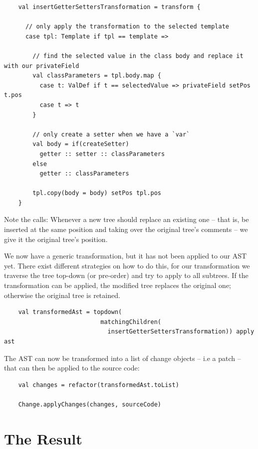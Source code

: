 \documentclass[10pt,a4paper,oneside]{scrreprt}
\begin{document}
\begin{lstlisting}
    val insertGetterSettersTransformation = transform {
        
      // only apply the transformation to the selected template
      case tpl: Template if tpl == template => 
      
        // find the selected value in the class body and replace it with our privateField
        val classParameters = tpl.body.map { 
          case t: ValDef if t == selectedValue => privateField setPos t.pos
          case t => t 
        }
      
        // only create a setter when we have a `var`
        val body = if(createSetter)  
          getter :: setter :: classParameters
        else
          getter :: classParameters
        
        tpl.copy(body = body) setPos tpl.pos
    }
\end{lstlisting}

Note the  calls: Whenever a new tree should replace an existing one -- that is, be inserted at the same position and taking over the original tree's comments -- we give it the original tree's position.

We now have a generic transformation, but it has not been applied to our AST yet. There exist different strategies on how to do this, for our transformation we traverse the tree top-down (or pre-order) and try to apply  to all subtrees. If the transformation can be applied, the modified tree replaces the original one; otherwise the original tree is retained.

\begin{lstlisting}
    val transformedAst = topdown(
                           matchingChildren(
                             insertGetterSettersTransformation)) apply ast
\end{lstlisting}
    
The AST can now be transformed into a list of change objects -- i.e a patch -- that can then be applied to the source code:

\begin{lstlisting}
    val changes = refactor(transformedAst.toList)
    
    Change.applyChanges(changes, sourceCode)
\end{lstlisting}

\section{The Result}
\end{document}
